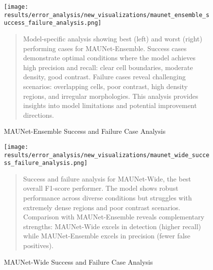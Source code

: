 \begin{figure}[htbp]
\centering
\texttt{[image: results/error\_analysis/new\_visualizations/maunet\_ensemble\_success\_failure\_analysis.png]}
\caption{MAUNet-Ensemble Success and Failure Case Analysis}
\label{fig:maunet_ensemble_analysis}
\begin{quote}
\small
Model-specific analysis showing best (left) and worst (right) performing cases for MAUNet-Ensemble. Success cases demonstrate optimal conditions where the model achieves high precision and recall: clear cell boundaries, moderate density, good contrast. Failure cases reveal challenging scenarios: overlapping cells, poor contrast, high density regions, and irregular morphologies. This analysis provides insights into model limitations and potential improvement directions.
\end{quote}
\end{figure}

\begin{figure}[htbp]
\centering
\texttt{[image: results/error\_analysis/new\_visualizations/maunet\_wide\_success\_failure\_analysis.png]}
\caption{MAUNet-Wide Success and Failure Case Analysis}
\label{fig:maunet_wide_analysis}
\begin{quote}
\small
Success and failure analysis for MAUNet-Wide, the best overall F1-score performer. The model shows robust performance across diverse conditions but struggles with extremely dense regions and poor contrast scenarios. Comparison with MAUNet-Ensemble reveals complementary strengths: MAUNet-Wide excels in detection (higher recall) while MAUNet-Ensemble excels in precision (fewer false positives).
\end{quote}
\end{figure}
